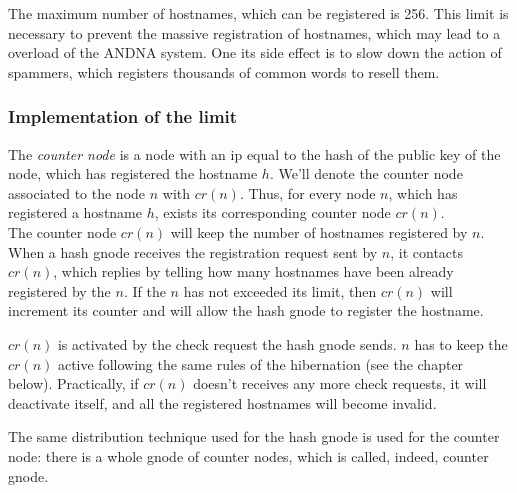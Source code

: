 \documentclass[a4paper]{article}
\begin{document}
The maximum number of hostnames, which can be registered is 256.
This limit is necessary to prevent the massive registration of hostnames,
which may lead to a overload of the ANDNA system. One its side effect is to
slow down the action of spammers, which registers thousands of common words to
resell them.

\subsubsection{Implementation of the limit}
The \emph{counter node} is a node with an ip equal to the hash of the public
key of the node, which has registered the hostname $h$. We'll denote the
counter node associated to the node $n$ with $cr(n)$.
Thus, for every node $n$, which has registered a hostname $h$, exists its
corresponding counter node $cr(n)$.\\

The counter node $cr(n)$ will keep the number of hostnames registered by
$n$.\\

When a hash gnode receives the registration request sent by $n$, it contacts
$cr(n)$, which replies by telling how many hostnames have been already registered
by the $n$. If the $n$ has not exceeded its limit, then $cr(n)$  will increment its counter
and will allow the hash gnode to register the hostname.

$cr(n)$ is activated by the check request the hash gnode sends. $n$ has to
keep the $cr(n)$ active following the same rules of the hibernation (see the
chapter below). Practically, if $cr(n)$ doesn't receives any more check
requests, it will deactivate itself, and all the registered hostnames will
become invalid.

The same distribution technique used for the hash gnode is used for the counter
node: there is a whole gnode of counter nodes, which is called, indeed,
counter gnode.
\end{document}
